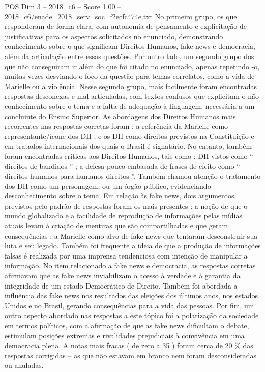 \begin{textsample}{POS Dim 3 – 2018\_c6 – Score 1.00 – 2018\_c6/enade\_2018\_serv\_soc\_f2ecfc474e.txt}
No primeiro grupo, os que responderam de forma clara, com autonomia de pensamento e explicitação de justificativas para os aspectos solicitados no enunciado, demonstrando conhecimento sobre o que significam Direitos Humanos, fake news e democracia, além da articulação entre essas questões.
Por outro lado, um segundo grupo dos que não conseguiram ir além do que foi citado no enunciado, apenas repetindo -o, muitas vezes desviando o foco da questão para temas correlatos, como a vida de Marielle ou a violência.
Nesse segundo grupo, mais facilmente foram encontradas respostas desconexas e mal articuladas, com textos confusos que explicitam o não conhecimento sobre o tema e a falta de adequação à linguagem, necessária a um concluinte do Ensino Superior.
As abordagens dos Direitos Humanos mais recorrentes nas respostas corretas foram : a referência da Marielle como representante/ícone dos DH ; e os DH como direitos previstos na Constituição e em tratados internacionais dos quais o Brasil é signatário.
No entanto, também foram encontradas críticas aos Direitos Humanos, tais como : DH vistos como “ direitos de bandidos ” ; a defesa pouco embasada de frases de efeito como “ direitos humanos para humanos direitos ”.
Também chamou atenção o tratamento dos DH como um personagem, ou um órgão público, evidenciando desconhecimento sobre o tema.
Em relação às fake news, dois argumentos previstos pelo padrão de respostas foram os mais presentes : a noção de que o mundo globalizado e a facilidade de reprodução de informações pelas mídias atuais levam à criação de mentiras que são compartilhadas e que geram consequências ; a Marielle como alvo de fake news que tentaram desconstruir sua luta e seu legado.
Também foi frequente a ideia de que a produção de informações falsas é realizada por uma imprensa tendenciosa com intenção de manipular a informação.
No item relacionado a fake news e democracia, as respostas corretas afirmavam que as fake news inviabilizam o acesso à verdade e à garantia da integridade de um estado Democrático de Direito.
Também foi abordada a influência das fake news nos resultados das eleições dos últimos anos, nos estados Unidos e no Brasil, gerando consequências para a vida das pessoas.
Por fim, um outro aspecto abordado nas respostas a este tópico foi a polarização da sociedade em termos políticos, com a afirmação de que as fake news dificultam o debate, estimulam posições extremas e rivalidades prejudiciais à convivência em uma democracia plena.
A notas mais fracas ( de zero a 35 ) foram cerca de 20 \% das respostas corrigidas – as que não estavam em branco nem foram desconsideradas ou anuladas.

\end{textsample}
